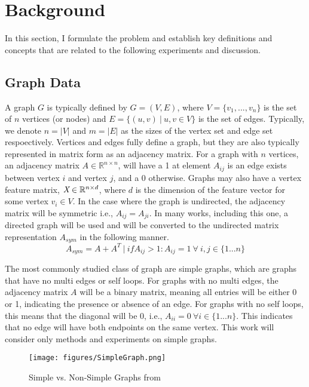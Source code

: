 \documentclass{article}
\begin{document}
\section{Background}
\label{background}

In this section, I formulate the problem and establish key definitions and concepts that are related to the following experiments and discussion. 

\subsection{Graph Data}

A graph $G$ is typically defined by $G = (V, E)$, where $V=\{v_1, ..., v_n\}$ is the set of $n$ vertices (or nodes) and $E=\{(u, v)\ |\ u, v \in V\}$ is the set of edges. Typically, we denote $n = |V|$ and $m = |E|$ as the sizes of the vertex set and edge set respoectively. Vertices and edges fully define a graph, but they are also typically represented in matrix form as an adjacency matrix. For a graph with $n$ vertices, an adjacency matrix $A \in\mathbb{R}^{n\times n}$, will have a 1 at element $A_{ij}$ is an edge exists between vertex $i$ and vertex $j$, and a 0 otherwise. Graphs may also have a vertex feature matrix, $\emph{X} \in \mathbb{R}^{n\times d}$, where $d$ is the dimension of the feature vector for some vertex $v_i \in V$. In the case where the graph is undirected, the adjacency matrix will be symmetric i.e., $A_{ij} = A_{ji}$. In many works, including this one, a directed graph will be used and will be converted to the undirected  matrix representation $A_{sym}$ in the following manner. 
\[
A_{sym} = A + A^T\ |\ if A_{ij} > 1: A_{ij} = 1\ \forall\ i,j \in \{1...n\}
\]

The most commonly studied class of graph are simple graphs, which are graphs that have no multi edges or self loops. For graphs with no multi edges, the adjacency matrix $A$ will be a binary matrix, meaning all entries will be either 0 or 1, indicating the presence or absence of an edge. For graphs with no self loops, this means that the diagonal will be 0, i.e., $A_{ii}=0\ \forall i \in \{1...n\}$. This indicates that no edge will have both endpoints on the same vertex. This work will consider only methods and experiments on simple graphs.

\begin{figure}[h]
\centering
\texttt{[image: figures/SimpleGraph.png]}
\caption{Simple vs. Non-Simple Graphs from \cite{simplegraphweisstein}}
\label{SimpleGraph}
\end{figure}
\end{document}
